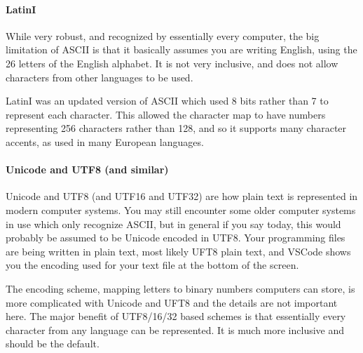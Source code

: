 \documentclass[letterpaper,10pt,british]{sphinxmanual}
\let\sphinxpxdimen\pdfpxdimen\else\newdimen\sphinxpxdimen
\begin{document}
\paragraph{Latin\sphinxhyphen{}I}
\label{\detokenize{chapters/programming_fundamentals/text_encoding:latin-i}}
\sphinxAtStartPar
While very robust, and recognized by essentially every computer, the big limitation of ASCII is that it basically assumes you are writing English, using the 26 letters of the English alphabet. It is not very inclusive, and does not allow characters from other languages to be used.

\sphinxAtStartPar
Latin\sphinxhyphen{}I was an updated version of ASCII which used 8 bits rather than 7 to represent each character. This allowed the character map to have numbers representing 256 characters rather than 128, and so it supports many character accents, as used in many European languages.


\paragraph{Unicode and UTF\sphinxhyphen{}8 (and similar)}
\label{\detokenize{chapters/programming_fundamentals/text_encoding:unicode-and-utf-8-and-similar}}
\sphinxAtStartPar
Unicode and UTF\sphinxhyphen{}8 (and UTF\sphinxhyphen{}16 and UTF\sphinxhyphen{}32) are how plain text is represented in modern computer systems. You may still encounter some older computer systems in use which only recognize ASCII, but in general if you say  today, this would probably be assumed to be Unicode encoded in UTF\sphinxhyphen{}8. Your programming files are being written in plain text, most likely UFT\sphinxhyphen{}8 plain text, and VSCode shows you the encoding used for your text file at the bottom of the screen.

\begin{figure}[htbp]
\centering

\noindent\sphinxincludegraphics[width=800\sphinxpxdimen]{{encoding_in_vscode}.png}
\end{figure}

\sphinxAtStartPar
The encoding scheme, mapping letters to binary numbers computers can store, is more complicated with Unicode and UFT\sphinxhyphen{}8 and the details are not important here. The major benefit of UTF\sphinxhyphen{}8/16/32 based schemes is that essentially every character from any language can be represented. It is much more inclusive and should be the default.
\end{document}
